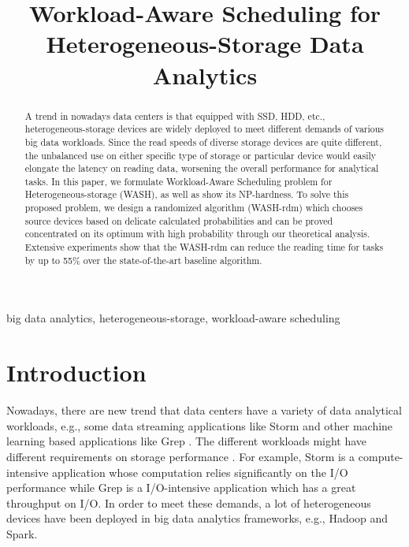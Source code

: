 \documentclass[conference]{IEEEtran}
\begin{document}
\title{Workload-Aware Scheduling for Heterogeneous-Storage Data Analytics\\
}

\author{
}


\maketitle
\begin{abstract}
A trend in nowadays data centers is that equipped with SSD, HDD, etc., heterogeneous-storage devices are widely deployed to meet different demands of various big data workloads. Since the read speeds of diverse storage devices are quite different, the unbalanced use on either specific type of storage or particular device would easily elongate the latency on reading data, worsening the overall performance for analytical tasks. In this paper, we formulate Workload-Aware Scheduling problem for Heterogeneous-storage (WASH), as well as show its NP-hardness. To solve this proposed problem, we design a randomized algorithm (WASH-rdm) which chooses source devices based on delicate calculated probabilities and can be proved concentrated on its optimum with high probability through our theoretical analysis. Extensive experiments show that the WASH-rdm can reduce the reading time for tasks by up to 55\% over the state-of-the-art baseline algorithm.

\end{abstract}

\begin{IEEEkeywords}
big data analytics, heterogeneous-storage, workload-aware scheduling
\end{IEEEkeywords}

\section{Introduction}

Nowadays, there are new trend that data centers have a variety of data analytical workloads, e.g., some data streaming applications like Storm
\cite{b40} and other machine learning based applications like Grep \cite{b27}. The different workloads might have different requirements on storage performance \cite{b28} \cite{b29} \cite{b30} \cite{b31}. For example, Storm is a compute-intensive application whose computation relies significantly on the I/O performance while Grep is a I/O-intensive application which has a great throughput on I/O. In order to meet these demands, a lot of heterogeneous devices have been deployed in big data analytics frameworks, e.g., Hadoop \cite{b14} and Spark\cite{b15}.
\end{document}
